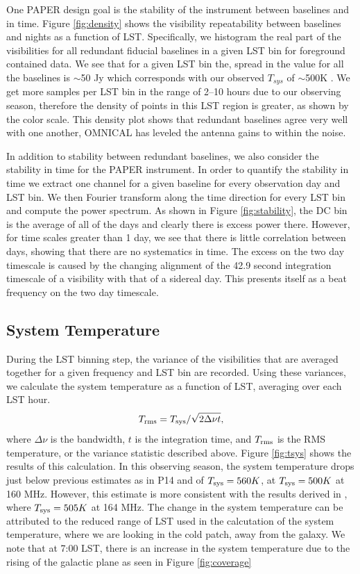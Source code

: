 \documentclass[twocolumn,numberedappendix]{emulateapj} \shorttitle{New Limits on the 21 cm Power Spectrum at $z=8.4$}
\newcommand{\Tsys}{T_{\rm sys}}
\begin{document}
One PAPER design goal is the stability of the instrument between
baselines and in time. Figure \ref{fig:density} shows the visibility repeatability between 
baselines and nights as a function of LST. Specifically, we histogram the real part of
the visibilities for all redundant fiducial baselines 
in a given LST bin for foreground contained data. We see that for a
given LST bin the, spread in the value for all the baselines is $\sim$50 Jy which corresponds with our observed
$T_{sys}$ of $\sim$500K .  We get
more samples per LST bin in the range of 2--10 hours due to our observing
season, therefore the density of points in this LST region is greater, as shown by
the color scale. This density plot shows that redundant baselines agree very well
with one another, OMNICAL has leveled the antenna gains to within the noise.

In addition to stability between redundant baselines, we also consider the
stability in time for the PAPER instrument. In order to quantify the stability
in time we extract one channel for a given baseline for every observation day
and LST bin. We then Fourier transform along the time direction for every LST
bin and compute the power spectrum. As shown in Figure \ref{fig:stability}, the
DC bin is the average of all of the days and clearly there is excess power
there. However, for time scales greater than 1 day, we see that there is little
correlation between days, showing that there are no systematics in time. The
excess on the two day timescale is caused by the changing alignment of the 42.9
second integration timescale of a visibility with that of a sidereal day. This
presents itself as a beat frequency on the two day timescale.

\subsection{System Temperature}   

During the LST binning step, the variance of the visibilities that are averaged
together for a given frequency and LST bin are recorded. Using these variances,
we calculate the system temperature as a function of LST, averaging over each
LST hour. 
\begin{equation}
    T_{\rm rms} = \Tsys/\sqrt{2\Delta\nu t}, 
\end{equation}
where $\Delta\nu$ is the bandwidth, $t$ is the integration time, and
$T_{\rm rms}$ is the RMS temperature, or the variance statistic described above.
Figure \ref{fig:tsys} shows the results of this calculation. In this observing
season, the system temperature drops just below previous estimates 
as in P14 and \citet{jacobs_et_al2014} of $\Tsys=560K$, at $\Tsys=500K$ at 160
MHz. However, this estimate is more consistent with the results derived in
\citep{moore_et_al2015}, where $\Tsys=505K$ at 164 MHz. The change in the
system temperature can be attributed to the reduced range of LST used in the
calcutation of the system temperature, where we are looking in the cold patch, away from the galaxy. We note that at 7:00 LST, there is an increase in the system temperature due to the rising of the galactic plane as seen in Figure \ref{fig:coverage}
\end{document}
